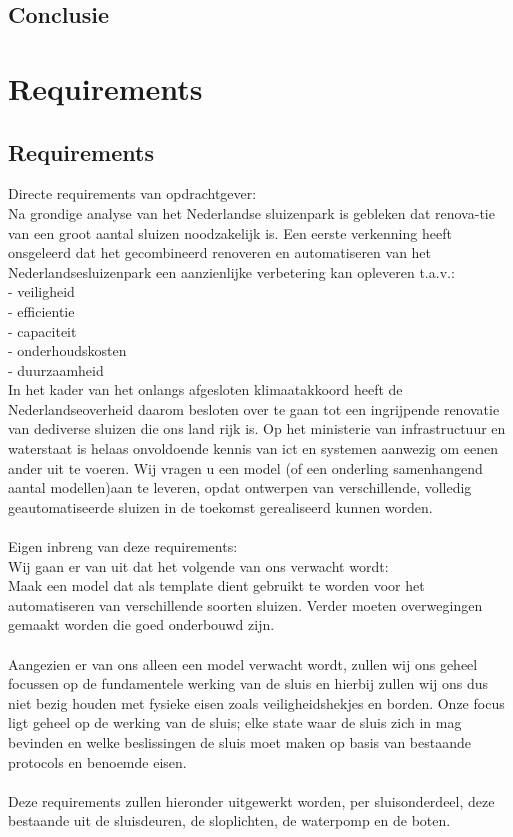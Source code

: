\documentclass{article}
\begin{document}
	\subsection{Conclusie}
	
	\section{Requirements}
	
	\subsection{Requirements}
	Directe requirements van opdrachtgever:\\
	Na grondige analyse van het Nederlandse sluizenpark is gebleken dat renova-tie van een groot aantal sluizen noodzakelijk is.  Een eerste verkenning heeft onsgeleerd dat het gecombineerd renoveren en automatiseren van het Nederlandsesluizenpark een aanzienlijke verbetering kan opleveren t.a.v.:\\
	- veiligheid\\
	- efficientie\\
	- capaciteit\\
	- onderhoudskosten\\
	- duurzaamheid\\
	In het kader van het onlangs afgesloten klimaatakkoord heeft de Nederlandseoverheid  daarom  besloten  over te gaan tot een ingrijpende renovatie van dediverse sluizen die ons land rijk is. Op het ministerie van infrastructuur en waterstaat is helaas onvoldoende kennis van ict en systemen aanwezig om eenen ander uit te voeren. Wij vragen u een model (of een onderling samenhangend aantal modellen)aan  te leveren, opdat ontwerpen van verschillende, volledig geautomatiseerde sluizen in de toekomst gerealiseerd kunnen worden.\\\\
	Eigen inbreng van deze requirements:\\
	Wij gaan er van uit dat het volgende van ons verwacht wordt:\\
	Maak een model dat als template dient gebruikt te worden voor het automatiseren van verschillende soorten sluizen. Verder moeten overwegingen gemaakt worden die goed onderbouwd zijn.\\\\ Aangezien er van ons alleen een model verwacht wordt, zullen wij ons geheel focussen op de fundamentele werking van de sluis en hierbij zullen wij ons dus niet bezig  houden met fysieke eisen zoals veiligheidshekjes en borden. Onze focus ligt geheel op de werking van de sluis; elke state waar de sluis zich in mag bevinden en welke beslissingen de sluis moet maken op basis van bestaande protocols en benoemde eisen. \\\\
	Deze requirements zullen hieronder uitgewerkt worden, per sluisonderdeel, deze bestaande uit de sluisdeuren, de sloplichten, de waterpomp en de boten.\\
	
\end{document}
